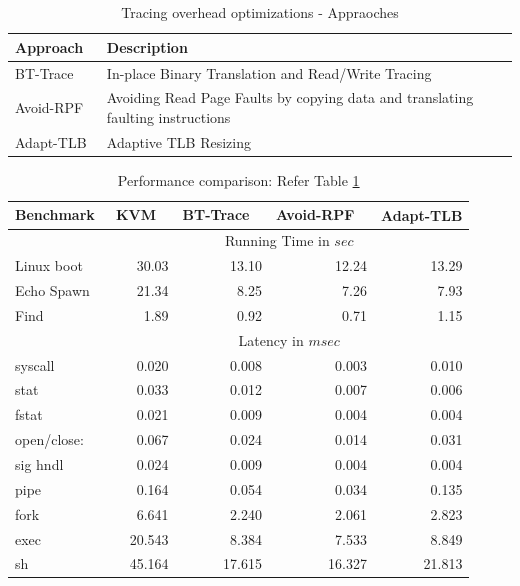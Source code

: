 \documentclass[10pt,twocolumn]{article}
\begin{document}
\begin{table}[!b]
\centering
\caption{Tracing overhead optimizations - Appraoches}
     \begin{tabular}{|l | p{5cm} |} \hline
       Approach \verb, , & Description \\ \hline
       BT-Trace & In-place Binary Translation and Read/Write Tracing \\ \hline
       Avoid-RPF & Avoiding Read Page Faults by copying data and translating faulting instructions  \\\hline
	   Adapt-TLB & Adaptive TLB Resizing  \\\hline

     \end{tabular}
\label{tab:diff_approaches}
\end{table}

\begin{table}
\centering
\caption{Performance comparison: Refer Table \ref{tab:diff_approaches}}
      \begin{tabular}{|l| r r r r |} \hline
	         Benchmark\verb, ,& KVM \verb, , & BT-Trace \verb, ,& Avoid-RPF \verb, , & Adapt-TLB  \\ \hline

     & \multicolumn{4}{c|}{ Running Time in $sec$}\\ \cline {2-5}  
Linux boot	&	30.03	&	13.10	&	12.24	&	13.29	\\
Echo Spawn	&	21.34	&	8.25	&	7.26	&	7.93	\\
Find	&	1.89	&	0.92	&	0.71	&	1.15	\\
\cline{2-5}
	   
     & \multicolumn{4}{c|}{Latency in $msec$}\\  \cline{2-5}
syscall	&	0.020	&	0.008	&	0.003	&	0.010	\\
stat	&	0.033	&	0.012	&	0.007	&	0.006	\\
fstat	&	0.021	&	0.009	&	0.004	&	0.004	\\
open/close:	&	0.067	&	0.024	&	0.014	&	0.031	\\
sig hndl	&	0.024	&	0.009	&	0.004	&	0.004	\\
pipe 	&	0.164	&	0.054	&	0.034	&	0.135	\\
fork	&	6.641	&	2.240	&	2.061	&	2.823	\\
exec	&	20.543	&	8.384	&	7.533	&	8.849	\\
sh	&	45.164	&	17.615	&	16.327	&	21.813	\\

 \hline
      \end{tabular}
\label{tab:detailed_results}
\end{table} 
\end{document}
